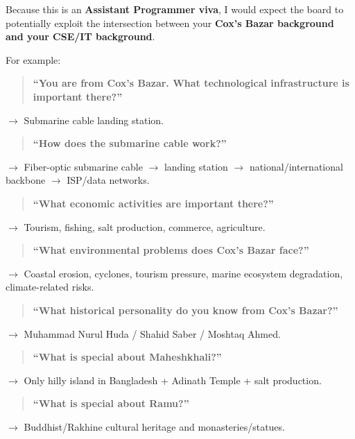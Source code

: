 Because this is an \textbf{Assistant Programmer viva}, I would expect the board to potentially exploit the intersection between your \textbf{Cox's Bazar background and your CSE/IT background}.

For example:

\begin{quote}
\textbf{``You are from Cox's Bazar. What technological infrastructure is important there?''}\\
\end{quote}

$\rightarrow$ Submarine cable landing station.

\begin{quote}
\textbf{``How does the submarine cable work?''}\\
\end{quote}

$\rightarrow$ Fiber-optic submarine cable $\rightarrow$ landing station $\rightarrow$ national/international backbone $\rightarrow$ ISP/data networks.

\begin{quote}
\textbf{``What economic activities are important there?''}\\
\end{quote}

$\rightarrow$ Tourism, fishing, salt production, commerce, agriculture.

\begin{quote}
\textbf{``What environmental problems does Cox's Bazar face?''}\\
\end{quote}

$\rightarrow$ Coastal erosion, cyclones, tourism pressure, marine ecosystem degradation, climate-related risks.

\begin{quote}
\textbf{``What historical personality do you know from Cox's Bazar?''}\\
\end{quote}

$\rightarrow$ Muhammad Nurul Huda / Shahid Saber / Moshtaq Ahmed.

\begin{quote}
\textbf{``What is special about Maheshkhali?''}\\
\end{quote}

$\rightarrow$ Only hilly island in Bangladesh + Adinath Temple + salt production.

\begin{quote}
\textbf{``What is special about Ramu?''}\\
\end{quote}

$\rightarrow$ Buddhist/Rakhine cultural heritage and monasteries/statues.

\medskip
